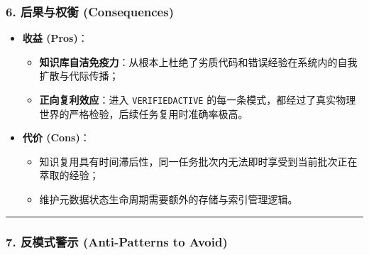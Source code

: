 \documentclass[
]{ctexart}
\providecommand{\tightlist}{%
  \setlength{\itemsep}{0pt}\setlength{\parskip}{0pt}}
\renewcommand{\_}{\discretionary{}{}{\textunderscore}}
\begin{document}
\subsubsection{6. 后果与权衡
(Consequences)}\label{ux540eux679cux4e0eux6743ux8861-consequences-13}

\begin{itemize}
\tightlist
\item
  \textbf{收益 (Pros)}：

  \begin{itemize}
  \tightlist
  \item
    \textbf{知识库自洁免疫力}：从根本上杜绝了劣质代码和错误经验在系统内的自我扩散与代际传播；
  \item
    \textbf{正向复利效应}：进入 \texttt{VERIFIED\_ACTIVE}
    的每一条模式，都经过了真实物理世界的严格检验，后续任务复用时准确率极高。
  \end{itemize}
\item
  \textbf{代价 (Cons)}：

  \begin{itemize}
  \tightlist
  \item
    知识复用具有时间滞后性，同一任务批次内无法即时享受到当前批次正在萃取的经验；
  \item
    维护元数据状态生命周期需要额外的存储与索引管理逻辑。
  \end{itemize}
\end{itemize}

\begin{center}\rule{0.5\linewidth}{0.5pt}\end{center}

\subsubsection{7. 反模式警示 (Anti-Patterns to
Avoid)}\label{ux53cdux6a21ux5f0fux8b66ux793a-anti-patterns-to-avoid-13}
\end{document}
